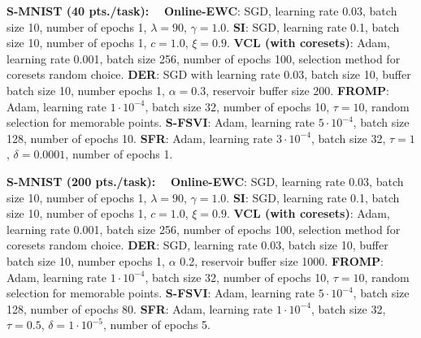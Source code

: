 \documentclass{article}
\renewcommand{\paragraph}[1]{{\bf #1}~~}
\begin{document}
\paragraph{S-MNIST (40 pts./task):}
	\textbf{Online-EWC}: SGD, learning rate $0.03$, batch size  10, number of epochs 1, $\lambda=90$, $\gamma=1.0$.
	\textbf{SI}: SGD, learning rate 0.1, batch size 10, number of epochs 1, $c=1.0$, $\xi=0.9$.
	\textbf{VCL (with coresets)}: Adam, learning rate 0.001, batch size 256, number of epochs 100, selection method for coresets random choice.
	\textbf{DER}: SGD with learning rate 0.03, batch size 10, buffer batch size 10, number epochs 1, $\alpha=0.3$, reservoir buffer size 200.
	\textbf{FROMP}: Adam, learning rate $1 \cdot 10^{-4}$, batch size 32, number of epochs 10, $\tau = 10$, random selection for memorable points.
	\textbf{S-FSVI}: Adam, learning rate $5 \cdot 10^{-4}$, batch size 128, number of epochs 10.
	\textbf{SFR}: Adam, learning rate $3 \cdot 10^{-4}$, batch size 32, $\tau=1$, $\delta=0.0001$, number of epochs 1.


\paragraph{S-MNIST (200 pts./task):}
	\textbf{Online-EWC}: SGD, learning rate $0.03$, batch size  10, number of epochs 1, $\lambda=90$, $\gamma=1.0$.
	\textbf{SI}: SGD, learning rate 0.1, batch size 10, number of epochs 1, $c=1.0$, $\xi=0.9$.
	\textbf{VCL (with coresets)}: Adam, learning rate 0.001, batch size 256, number of epochs 100, selection method for coresets random choice.
	\textbf{DER}: SGD, learning rate 0.03, batch size 10, buffer batch size 10, number epochs 1, $\alpha$ 0.2, reservoir buffer size 1000.
	\textbf{FROMP}: Adam, learning rate $1 \cdot 10^{-4}$, batch size 32, number of epochs 10, $\tau = 10$, random selection for memorable points.
	\textbf{S-FSVI}: Adam, learning rate $5 \cdot 10^{-4}$, batch size 128, number of epochs 80.
	\textbf{SFR}: Adam, learning rate $1 \cdot 10^{-4}$, batch size 32, $\tau=0.5$, $\delta=1 \cdot 10^{-5}$, number of epochs 5.
 
\end{document}
